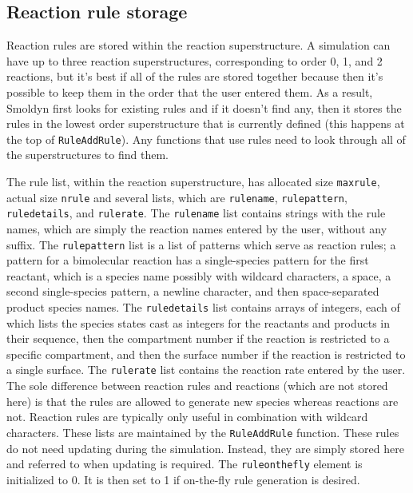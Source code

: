 \documentclass {book}
\begin{document}
\subsection*{Reaction rule storage}

Reaction rules are stored within the reaction superstructure.  A simulation can have up to three reaction superstructures, corresponding to order 0, 1, and 2 reactions, but it's best if all of the rules are stored together because then it's possible to keep them in the order that the user entered them.  As a result, Smoldyn first looks for existing rules and if it doesn't find any, then it stores the rules in the lowest order superstructure that is currently defined (this happens at the top of \texttt{RuleAddRule}).  Any functions that use rules need to look through all of the superstructures to find them.

The rule list, within the reaction superstructure, has allocated size \texttt{maxrule}, actual size \texttt{nrule} and several lists, which are \texttt{rulename}, \texttt{rulepattern}, \texttt{ruledetails}, and \texttt{rulerate}.  The \texttt{rulename} list contains strings with the rule names, which are simply the reaction names entered by the user, without any suffix.  The \texttt{rulepattern} list is a list of patterns which serve as reaction rules; a pattern for a bimolecular reaction has a single-species pattern for the first reactant, which is a species name possibly with wildcard characters, a space, a second single-species pattern, a newline character, and then space-separated product species names.  The \texttt{ruledetails} list contains arrays of integers, each of which lists the species states cast as integers for the reactants and products in their sequence, then the compartment number if the reaction is restricted to a specific compartment, and then the surface number if the reaction is restricted to a single surface.  The \texttt{rulerate} list contains the reaction rate entered by the user.  The sole difference between reaction rules and reactions (which are not stored here) is that the rules are allowed to generate new species whereas reactions are not.  Reaction rules are typically only useful in combination with wildcard characters.  These lists are maintained by the \texttt{RuleAddRule} function.  These rules do not need updating during the simulation.  Instead, they are simply stored here and referred to when updating is required.  The \texttt{ruleonthefly} element is initialized to 0.  It is then set to 1 if on-the-fly rule generation is desired.
\end{document}
